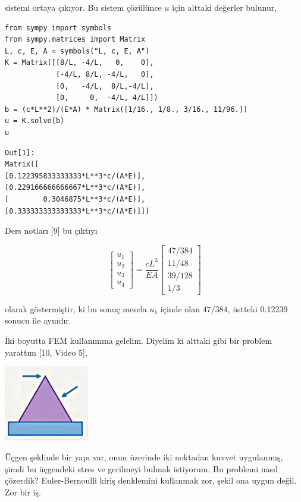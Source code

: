 \documentclass[12pt,fleqn]{article}\usepackage{../../common}
\begin{document}
sistemi ortaya çıkıyor. Bu sistem çözülünce $u$ için alttaki değerler bulunur,

\begin{verbatim}
from sympy import symbols
from sympy.matrices import Matrix
L, c, E, A = symbols("L, c, E, A")
K = Matrix([[8/L, -4/L,   0,    0],
            [-4/L, 8/L, -4/L,   0],
            [0,   -4/L,  8/L,-4/L],
            [0,     0,  -4/L, 4/L]])           
b = (c*L**2)/(E*A) * Matrix([1/16., 1/8., 3/16., 11/96.])
u = K.solve(b)
u
\end{verbatim}

\begin{verbatim}
Out[1]: 
Matrix([
[0.122395833333333*L**3*c/(A*E)],
[0.229166666666667*L**3*c/(A*E)],
[        0.3046875*L**3*c/(A*E)],
[0.333333333333333*L**3*c/(A*E)]])
\end{verbatim}

Ders notları [9] bu çıktıyı

$$
\left[\begin{array}{c}
u_1 \\ u_2 \\ u_3 \\ u_4 
\end{array}\right] =
\frac{cL^3}{EA}
\left[\begin{array}{c}
47/384 \\ 11/48 \\ 39/128 \\ 1/3
\end{array}\right]
$$

olarak göstermiştir, ki bu sonuç mesela $u_1$ içinde olan $47/384$, üstteki
0.12239 sonucu ile aynıdır.

İki boyutta FEM kullanımına gelelim. Diyelim ki alttaki gibi bir problem
yarattım [10, Video 5],

\includegraphics[width=10em]{compscieng_bpp45fem3_01.jpg}

Üçgen şeklinde bir yapı var, onun üzerinde iki noktadan kuvvet uygulanmış, şimdi
bu üçgendeki stres ve gerilmeyi bulmak istiyorum. Bu problemi nasıl çözerdik?
Euler-Bernoulli kiriş denklemini kullanmak zor, şekil ona uygun değil. Zor bir
iş.
\end{document}
